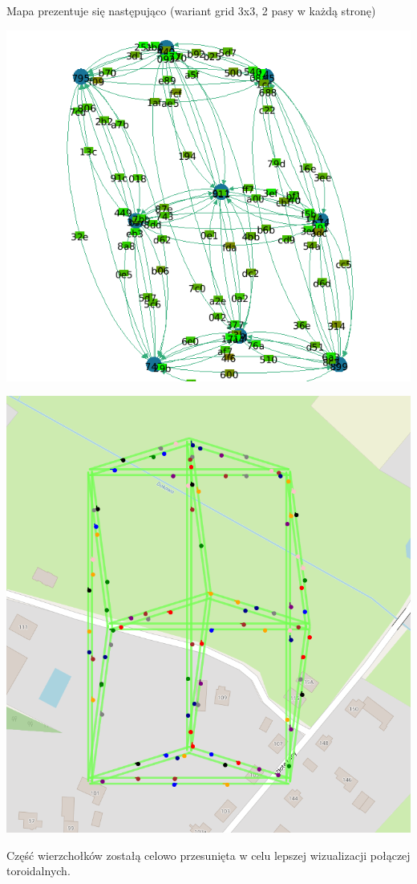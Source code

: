 \documentclass[a4paper]{article}
\begin{document}
Mapa prezentuje się następująco (wariant grid 3x3, 2 pasy w każdą stronę)


\includegraphics[width=1\textwidth]{./imgs/map1.png}

\includegraphics[width=1\textwidth]{./imgs/map2.png}

Część wierzchołków zostałą celowo przesunięta w celu lepszej wizualizacji połączej toroidalnych.
\end{document}
